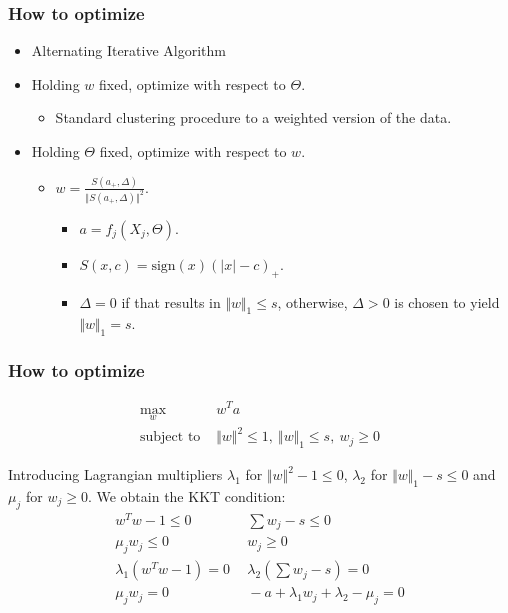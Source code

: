 \documentclass{beamer}
\begin{document}
\begin{frame}
\frametitle{How to optimize}
\begin{itemize}
    \item Alternating Iterative Algorithm
    \item Holding $w$ fixed, optimize with respect to $\Theta$.
        \begin{itemize}
            \item Standard clustering procedure to a weighted version of the data.
        \end{itemize}
    \item Holding $\Theta$ fixed, optimize with respect to $w$.
        \begin{itemize}
            \item $w = \frac{S(a_{+}, \Delta)}{\Vert S(a_{+},\Delta) \Vert^2}$.
            \begin{itemize}
            \item $a = f_j(X_j, \Theta)$.
            \item $S(x,c) = \text{sign}(x)(\vert x \vert - c)_{+}$.
            \item $\Delta=0$ if that results in $\Vert w \Vert_1 \le s$, otherwise, $\Delta > 0$ is chosen to yield $\Vert w \Vert_1 = s$.
            \end{itemize}
        \end{itemize}
\end{itemize}
\end{frame}
\begin{frame}
\frametitle{How to optimize}

\begin{eqnarray*}
\max_{w} & w^Ta\\
\text{subject to } & \Vert w \Vert^2 \le 1,~ \Vert w \Vert_1 \le s, ~ w_j \ge 0
\end{eqnarray*}

Introducing Lagrangian multipliers $\lambda_1$ for $\Vert w \Vert^2 -1 \le 0$, $\lambda_2$ for $\Vert w \Vert_1 - s \le 0$ and $\mu_j$ for $w_j \ge 0$. We obtain the KKT condition:
\begin{eqnarray*}
 w^T w -1 \le 0 ~&~
 \sum w_j -s \le 0\\
 \mu_j w_j  \le 0 ~&~
 w_j  \ge 0\\
 \lambda_1 (w^T w -1 ) = 0 ~&~
 \lambda_2 (\sum w_j -s ) = 0\\
 \mu_j w_j =0 ~&~
 -a + \lambda_1 w_j + \lambda_2 - \mu_j =0
\end{eqnarray*}
\end{frame}
\end{document}
